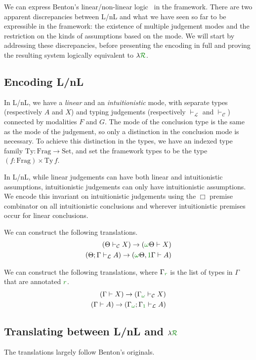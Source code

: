 We can express Benton's linear/non-linear logic~\cite{Benton94} in the
framework.
There are two apparent discrepancies between L/nL and what we have seen so far
to be expressible in the framework: the existence of multiple judgement modes
and the restriction on the kinds of assumptions based on the mode.
We will start by addressing these discrepancies, before presenting the encoding
in full and proving the resulting system logically equivalent to
$\lambda\gr{\mathcal R}$.

\subsection{Encoding L/nL}

In L/nL, we have a \emph{linear} and an \emph{intuitionistic} mode, with
separate types (respectively $A$ and $X$) and typing judgements (respectively
$\vdash_{\mathcal L}$ and $\vdash_{\mathcal C}$) connected by modalities $F$ and
$G$.
The mode of the conclusion type is the same as the mode of the judgement, so
only a distinction in the conclusion mode is necessary.
To achieve this distinction in the types, we have an indexed type family
$\mathrm{Ty} : \mathrm{Frag} \to \mathrm{Set}$, and set the framework types to
be the type $(f : \mathrm{Frag}) \times \mathrm{Ty}\,f$.

In L/nL, while linear judgements can have both linear and intuitionistic
assumptions, intuitionistic judgements can only have intuitionistic assumptions.
We encode this invariant on intuitionistic judgements using the $\Box$
premise combinator on all intuitionistic conclusions and wherever
intuitionistic premises occur for linear conclusions.

\begin{proposition}
  We can construct the following translations.
  \begin{align}
    (\Theta \vdash_{\mathcal C} X) \to (\gr\omega\Theta \vdash X) \\
    (\Theta; \Gamma \vdash_{\mathcal L} A) \to
    (\gr\omega\Theta, \gr1\Gamma \vdash A)
  \end{align}
\end{proposition}

\begin{proposition}
  We can construct the following translations, where $\Gamma_{\gr r}$ is the
  list of types in $\Gamma$ that are annotated $\gr r$.
  \begin{align}
    (\Gamma \vdash X) \to (\Gamma_{\gr\omega} \vdash_{\mathcal C} X) \\
    (\Gamma \vdash A) \to
    (\Gamma_{\gr\omega}; \Gamma_{\gr1} \vdash_{\mathcal L} A)
  \end{align}
\end{proposition}

\subsection{Translating between L/nL and $\lambda\gr{\mathcal R}$}

The translations largely follow Benton's originals.
